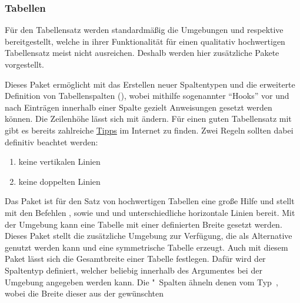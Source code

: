 \subsubsection{%
  Tabellen%
}
%
Für den Tabellensatz werden standardmäßig die Umgebungen  
und  respektive  bereitgestellt, 
welche in ihrer Funktionalität für einen qualitativ hochwertigen Tabellensatz 
meist nicht ausreichen. Deshalb werden hier zusätzliche Pakete vorgestellt. 

\begin{DeclarePackages}
  Dieses Paket ermöglicht mit  das Erstellen neuer 
  Spaltentypen und die erweiterte Definition von Tabellenspalten
  (\PValue{>\MPValue{\dots}}\PValue{<\MPValue{\dots}}), 
  wobei mithilfe sogenannter \enquote{Hooks} vor und nach Einträgen innerhalb 
  einer Spalte gezielt Anweisungen gesetzt werden können. Die Zeilenhöhe lässt 
  sich mit  ändern. 
  Für einen guten Tabellensatz mit  gibt es bereits zahlreiche 
  \href{http://userpage.fu-berlin.de/latex/Materialien/tabsatz.pdf}{Tipps} im 
  Internet zu finden. Zwei Regeln sollten dabei definitiv beachtet werden:
  \begin{enumerate}[itemindent=0pt,labelwidth=*,labelsep=1em,label=\Roman*.]
  \item keine vertikalen Linien
  \item keine doppelten Linien
  \end{enumerate}
  Das Paket  ist für den Satz von hochwertigen Tabellen eine 
  große Hilfe und stellt mit den Befehlen ,  
  sowie  und  und unterschiedliche horizontale 
  Linien bereit.
  Mit der Umgebung  kann eine Tabelle mit einer 
  definierten Breite gesetzt werden. Dieses Paket stellt die zusätzliche 
  Umgebung  zur Verfügung, die als Alternative genutzt 
  werden kann und eine symmetrische Tabelle erzeugt.
  Auch mit diesem Paket lässt sich die Gesamtbreite einer Tabelle festlegen. 
  Dafür wird der Spaltentyp  definiert, welcher beliebig innerhalb 
  des Argumentes  bei der Umgebung 
  angegeben werden kann. Die "~Spalten ähneln denen vom 
  Typ~, wobei die Breite dieser aus der gewünschten 

\end{DeclarePackages}
